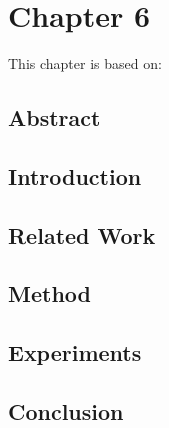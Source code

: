 \cleardoublepage
\chapter{Chapter 6}

\label{ch:6}

\newpage
This chapter is based on: 

\section*{Abstract}

\section{Introduction}

\section{Related Work}

\section{Method}

\section{Experiments}

\section{Conclusion}